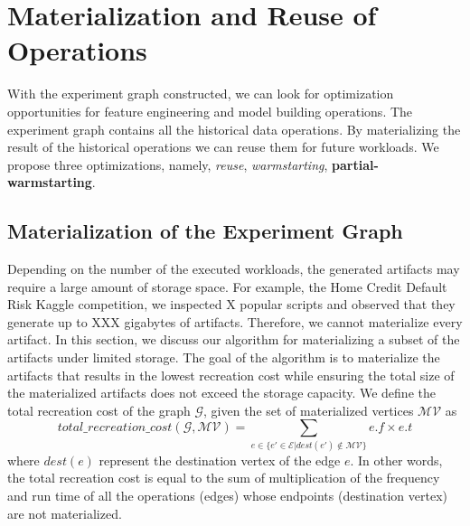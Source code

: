 \section{Materialization and Reuse of Operations}\label{sec-materializaiton-and-reuse}
With the experiment graph constructed, we can look for optimization opportunities for feature engineering and model building operations.
The experiment graph contains all the historical data operations.
By materializing the result of the historical operations we can reuse them for future workloads.
We propose three optimizations, namely, \textit{reuse}, \textit{warmstarting}, \textbf{partial-warmstarting}.

\subsection{Materialization of the Experiment Graph}
Depending on the number of the executed workloads, the generated artifacts may require a large amount of storage space.
For example, the Home Credit Default Risk Kaggle competition, we inspected X popular scripts and observed that they generate up to XXX gigabytes of artifacts. 
Therefore, we cannot materialize every artifact.
In this section, we discuss our algorithm for materializing a subset of the artifacts under limited storage.
The goal of the algorithm is to materialize the artifacts that results in the lowest recreation cost while ensuring the total size of the materialized artifacts does not exceed the storage capacity.
We define the total recreation cost of the graph $\mathcal{G}$, given the set of materialized vertices $\mathcal{MV}$ as 
\[
total\_recreation\_cost(\mathcal{G}, \mathcal{MV}) =  \sum\limits_{e \in \{e' \in \mathcal{E}  \lvert dest(e') \notin \mathcal{MV}\}}  e.f \times e.t
\]
where $dest(e)$ represent the destination vertex of the edge $e$.
In other words, the total recreation cost is equal to the sum of multiplication of the frequency and run time of all the operations (edges) whose endpoints (destination vertex) are not materialized.

